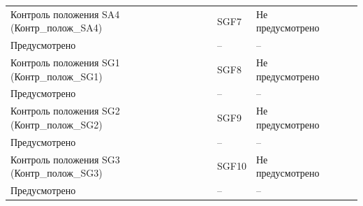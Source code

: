 \begin{longtable}{|>{\centering\arraybackslash}m{5.3cm}|>{\centering\arraybackslash}m{3.3cm}|>{\centering\arraybackslash}m{4.2cm}|>{\centering\arraybackslash}m{1.8cm}|>{\centering\arraybackslash}m{1cm}|}
\hline
\centering Контроль положения SA4 (Контр\_полож\_SA4)  & \centering SGF7 & \centering Не предусмотрено \\ Предусмотрено & \centering -- & \centering \arraybackslash -- \\
\hline
\centering Контроль положения SG1 (Контр\_полож\_SG1)  & \centering SGF8 & \centering Не предусмотрено \\ Предусмотрено & \centering -- & \centering \arraybackslash -- \\
\hline
\centering Контроль положения SG2 (Контр\_полож\_SG2)  & \centering SGF9 & \centering Не предусмотрено \\ Предусмотрено & \centering -- & \centering \arraybackslash -- \\
\hline
\centering Контроль положения SG3 (Контр\_полож\_SG3)  & \centering SGF10 & \centering Не предусмотрено \\ Предусмотрено & \centering -- & \centering \arraybackslash -- \\
\hline
\end{longtable}
\normalsize